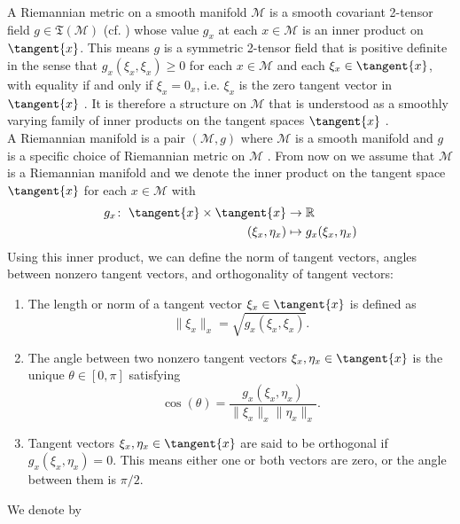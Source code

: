 A Riemannian metric on a smooth manifold $\mathcal{M}$ is a smooth covariant 2-tensor field $g \in \mathfrak{T}(\mathcal{M})$ (cf. \cite[p.~397]{Lee:2019}) whose value $g_x$ at each $x \in \mathcal{M}$ is an inner product on $\tangent{x}$. This means $g$ is a symmetric 2-tensor field that is positive definite in the sense that $g_x(\xi_x, \xi_x) \geq 0$ for each $x \in \mathcal{M}$ and each $\xi_x \in \tangent{x}$, with equality if and only if $\xi_x = 0_x$, i.e. $\xi_x$ is the zero tangent vector in $\tangent{x}$ \cite[p.~11]{Lee:2019}. It is therefore a structure on $\mathcal{M}$ that is understood as a smoothly varying family of inner products on the tangent spaces $\tangent{x}$ \cite[p.~6]{BergmannHerzogLouzeiroSilvaTenbrinckVidalNunez:2020:1}. \\
A Riemannian manifold is a pair $(\mathcal{M},g)$ where $\mathcal{M}$ is a smooth manifold and $g$ is a specific choice of Riemannian metric on $\mathcal{M}$ \cite[p.~11]{Lee:2019}. From now on we assume that $\mathcal{M}$ is a Riemannian manifold and we denote the inner product on the tangent space $\tangent{x}$ for each $x \in \mathcal{M}$ with
\begin{align*}
    g_x \colon \; \tangent{x} \times \tangent{x} & \to \mathbb{R} \\
    (\xi_x, \eta_x) & \mapsto g_x(\xi_x, \eta_x)
\end{align*}
Using this inner product, we can define the norm of tangent vectors, angles between nonzero tangent vectors, and orthogonality of tangent vectors:
\begin{enumerate}
    \item The length or norm of a tangent vector $\xi_x \in \tangent{x}$ is defined as \begin{equation*}
     \lVert \xi_x \rVert_x = \sqrt{g_x(\xi_x, \xi_x)}. \end{equation*}    \item The angle between two nonzero tangent vectors $\xi_x, \eta_x \in \tangent{x}$ is the unique $\theta \in [0, \pi]$ satisfying \begin{equation*}
     \cos(\theta) = \frac{g_x(\xi_x, \eta_x)}{\lVert \xi_x \rVert_x \lVert \eta_x \rVert_x}. \end{equation*}    \item Tangent vectors $\xi_x, \eta_x \in \tangent{x}$ are said to be orthogonal if $g_x(\xi_x, \eta_x) = 0$. This means either one or both vectors are zero, or the angle between them is $\pi / 2$.
\end{enumerate}
We denote by 
